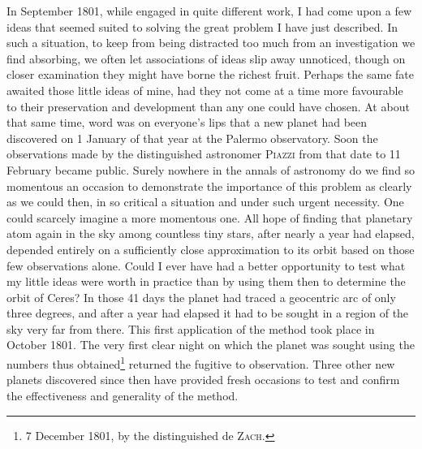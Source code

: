 In September 1801, while engaged in quite different work, I had come upon a few ideas that seemed suited to solving the great problem I have just described. In such a situation, to keep from being distracted too much from an investigation we find absorbing, we often let associations of ideas slip away unnoticed, though on closer examination they might have borne the richest fruit. Perhaps the same fate awaited those little ideas of mine, had they not come at a time more favourable to their preservation and development than any one could have chosen. At about that same time, word was on everyone's lips that a new planet had been discovered on 1 January of that year at the Palermo observatory. Soon the observations made by the distinguished astronomer \textsc{Piazzi} from
that date to 11 February became public. Surely nowhere in the annals of astronomy do we find so momentous an occasion to demonstrate the importance of this problem as clearly as we could then, in so critical a situation and under such urgent necessity. One could scarcely imagine a more momentous one. All hope of finding that planetary atom again in the sky among countless tiny stars, after nearly a year had elapsed, depended entirely on a sufficiently close approximation to its orbit based on those few observations alone. Could I ever have had a better opportunity to test what my little ideas were worth in practice than by using them then to determine the orbit of Ceres? In those 41 days the planet had traced a geocentric arc of only three degrees, and after a year had elapsed it had to be sought in a region of the sky very far from there. This first application of the method took place in October 1801. The very first clear night on which the planet was sought using the numbers thus obtained\footnote{7 December 1801, by the distinguished de \textsc{Zach}.} returned the fugitive to observation. Three other new planets discovered since then have provided fresh occasions to test and confirm the effectiveness and generality of the method.

